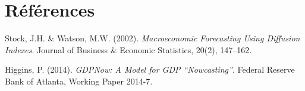 \documentclass[11pt,a4paper]{article}
\begin{document}
\section*{Références}
\begin{enumerate}[leftmargin=1.6em, label=\textbf{[\arabic*]}]
\item \hypertarget{ref1}{} Stock, J.H. \& Watson, M.W. (2002). \textit{Macroeconomic Forecasting Using Diffusion Indexes}. Journal of Business \& Economic Statistics, 20(2), 147--162.
\item Higgins, P. (2014). \textit{GDPNow: A Model for GDP ``Nowcasting''}. Federal Reserve Bank of Atlanta, Working Paper 2014-7.
\end{enumerate}
\end{document}
